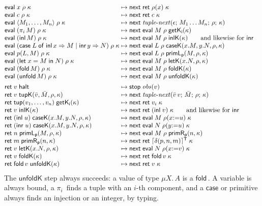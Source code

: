 \documentclass[10pt]{article}
\theoremstyle{acmplain}
\newcommand{\key}[1]{\mathsf{#1}}
\newcommand{\Let}{\key{let}\;}
\newcommand{\In}{\;\key{in}\;}
\newcommand{\inl}{\key{inl}\,}
\newcommand{\Case}[5]{\key{case}\;#1\;\key{of}\;\key{inl}\,#2 \Rightarrow #3 \mid \key{inr}\,#4 \Rightarrow #5}
\newcommand{\tuple}[1]{\langle #1 \rangle}
\newcommand{\prj}[1]{\pi_{#1}\,}
\newcommand{\prim}[3]{#1(#2, #3)}
\newcommand{\ext}[3]{#1(#2{:=}#3)}
\newcommand{\ev}[3]{\key{eval}\;#1\;#2\;#3}
\newcommand{\rt}[2]{\key{ret}\;#1\;#2}
\newcommand{\nxt}{\key{next}\;}
\newcommand{\stp}{\key{stop}\;}
\newcommand{\obs}{\mathit{obs}}
\newcommand{\tupV}[1]{\key{tup}(#1)}
\newcommand{\inlV}{\key{inl}\;}
\newcommand{\inrV}{\key{inr}\;}
\newcommand{\Kf}[2]{\key{#1}(#2)}
\newcommand{\halt}{\key{halt}}
\newcommand{\tnext}{\mathit{tuple\text{-}next}}
\newcommand{\Tres}[1]{\lceil #1 \rceil^{\mathsf{T}}}      %
\newcommand{\Mmu}[2]{\mu #1.\,#2}                         %
\newcommand{\Mfold}{\key{fold}\,}
\newcommand{\Munfold}{\key{unfold}\,}
\begin{document}
\[
\begin{array}{@{}l@{\;\mapsto\;}l@{\quad}l@{}}
  \ev{x}{\rho}{\kappa} & \nxt \rt{\rho(x)}{\kappa} \\
  \ev{c}{\rho}{\kappa} & \nxt \rt{c}{\kappa} \\
  \ev{\tuple{M_1, \ldots, M_n}}{\rho}{\kappa} & \nxt \tnext(\epsilon;\, M_1 \ldots M_n;\, \rho;\, \kappa) \\
  \ev{(\prj{i} M)}{\rho}{\kappa} & \nxt \ev{M}{\rho}{\Kf{getK_i}{\kappa}} \\
  \ev{(\inl M)}{\rho}{\kappa} & \nxt \ev{M}{\rho}{\Kf{inlK}{\kappa}}
    \qquad\text{and likewise for } \key{inr} \\
  \ev{(\Case{L}{x}{M}{y}{N})}{\rho}{\kappa} & \nxt \ev{L}{\rho}{\Kf{caseK}{x.M, y.N, \rho, \kappa}} \\
  \ev{\prim{p}{L}{M}}{\rho}{\kappa} & \nxt \ev{L}{\rho}{\Kf{primL_p}{M, \rho, \kappa}} \\
  \ev{(\Let x = M \In N)}{\rho}{\kappa} & \nxt \ev{M}{\rho}{\Kf{letK}{x.N, \rho, \kappa}} \\
  \ev{(\Mfold M)}{\rho}{\kappa} & \nxt \ev{M}{\rho}{\Kf{foldK}{\kappa}} \\
  \ev{(\Munfold M)}{\rho}{\kappa} & \nxt \ev{M}{\rho}{\Kf{unfoldK}{\kappa}} \\[1ex]
  \rt{v}{\halt} & \stp \obs(v) \\
  \rt{v}{\Kf{tupK}{\bar{v}, \bar{M}, \rho, \kappa}} & \nxt \tnext(\bar{v}\,v;\, \bar{M};\, \rho;\, \kappa) \\
  \rt{\tupV{v_1, \ldots, v_n}}{\Kf{getK_i}{\kappa}} & \nxt \rt{v_i}{\kappa} \\
  \rt{v}{\Kf{inlK}{\kappa}} & \nxt \rt{(\inlV v)}{\kappa}
    \qquad\text{and likewise for } \key{inr} \\
  \rt{(\inlV u)}{\Kf{caseK}{x.M, y.N, \rho, \kappa}} & \nxt \ev{M}{\ext{\rho}{x}{u}}{\kappa} \\
  \rt{(\inrV u)}{\Kf{caseK}{x.M, y.N, \rho, \kappa}} & \nxt \ev{N}{\ext{\rho}{y}{u}}{\kappa} \\
  \rt{n}{\Kf{primL_p}{M, \rho, \kappa}} & \nxt \ev{M}{\rho}{\Kf{primR_p}{n, \kappa}} \\
  \rt{m}{\Kf{primR_p}{n, \kappa}} & \nxt \rt{\Tres{\delta(p, n, m)}}{\kappa} \\
  \rt{v}{\Kf{letK}{x.N, \rho, \kappa}} & \nxt \ev{N}{\ext{\rho}{x}{v}}{\kappa} \\
  \rt{v}{\Kf{foldK}{\kappa}} & \nxt \rt{\Mfold v}{\kappa} \\
  \rt{\Mfold v}{\Kf{unfoldK}{\kappa}} & \nxt \rt{v}{\kappa}
\end{array}
\]
The $\key{unfoldK}$ step always succeeds: a value of type $\Mmu{X}{A}$ is a
$\Mfold$. A variable is always bound, a $\prj{i}$ finds a tuple with an
$i$-th component, and a $\key{case}$ or primitive always finds an injection
or an integer, by typing.
\end{document}
